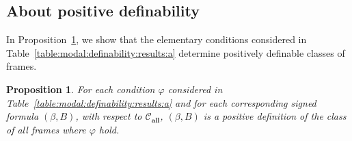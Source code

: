 \documentclass[draft]{article}
\newtheorem{proposition}{Proposition}
\def\allfra{\mathbf{all}}
\begin{document}
\subsection{About positive definability}
%
%
In Proposition~\ref{Proposition:about:correpsondence:table:a}, we show that the elementary conditions considered in Table~\ref{table:modal:definability:results:a} determine positively definable classes of frames.
%
%
\begin{proposition}\label{Proposition:about:correpsondence:table:a}
%
%
For each condition $\varphi$ considered in Table~\ref{table:modal:definability:results:a} and for each corresponding signed formula $(\beta,B)$, with respect to ${\mathcal C}_{\allfra}$, $(\beta,B)$ is a positive definition of the class of all frames where $\varphi$ hold.
%
%
\end{proposition}
%
%
\end{document}
